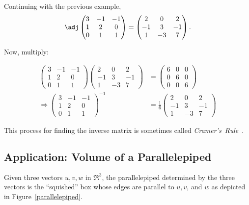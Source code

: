 \begin{example}
Continuing with the previous example,
\[
\adj \begin{pmatrix}
3 & -1 & -1 \\
1 & 2 & 0 \\
0 & 1 & 1 \\
\end{pmatrix} = \begin{pmatrix}
2 & 0 & 2 \\
-1 & 3 & -1 \\
1 & -3 & 7 \\
\end{pmatrix}.
\]

Now, multiply:

\begin{align*}
\begin{pmatrix}
3 & -1 & -1 \\
1 & 2 & 0 \\
0 & 1 & 1 
\end{pmatrix}
\begin{pmatrix}
2 & 0 & 2 \\
-1 & 3 & -1 \\
1 & -3 & 7 
\end{pmatrix}
&=
\begin{pmatrix}
6 & 0 & 0 \\
0 & 6 & 0 \\
0 & 0 & 6 
\end{pmatrix} \\[1mm]
\Rightarrow \begin{pmatrix}
3 & -1 & -1 \\
1 & 2 & 0 \\
0 & 1 & 1 
\end{pmatrix}^{-1}
& = \frac{1}{6}\begin{pmatrix}
2 & 0 & 2 \\
-1 & 3 & -1 \\
1 & -3 & 7 
\end{pmatrix}
\end{align*}

This process for finding the inverse matrix is sometimes called \emph{Cramer's~Rule}~.
\end{example}

\subsection{Application: Volume of a Parallelepiped}

Given three vectors $u,v,w$ in $\Re^3$, the parallelepiped determined by the three vectors is the ``squished'' box whose edges are parallel to $u, v$, and $w$ as depicted in Figure~\ref{parallelepiped}.

